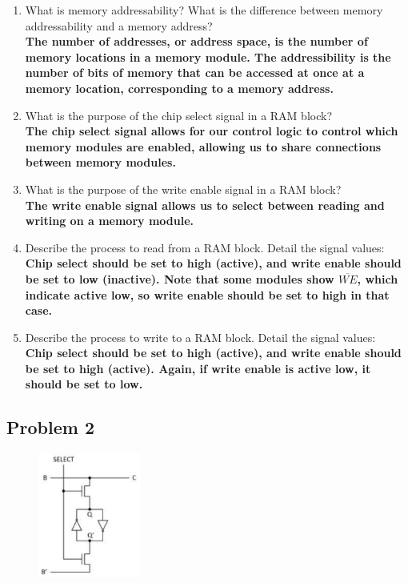 \documentclass{article}
\begin{document}
\begin{enumerate}[label=\alph*.]
\item What is memory addressability? What is the difference between memory addressability and a memory address? \\
\textbf{The number of addresses, or address space, is the number of memory locations in a memory module. The addressibility is the number of bits of memory that can be accessed at once at a memory location, corresponding to a memory address.}
\item What is the purpose of the chip select signal in a RAM block? \\
\textbf{The chip select signal allows for our control logic to control which memory modules are enabled, allowing us to share connections between memory modules.}
\item What is the purpose of the write enable signal in a RAM block? \\
\textbf{The write enable signal allows us to select between reading and writing on a memory module.}
\item Describe the process to read from a RAM block. Detail the signal values: \\
\textbf{Chip select should be set to high (active), and write enable should be set to low (inactive). Note that some modules show $\overline{WE}$, which indicate active low, so write enable should be set to high in that case.}
\item Describe the process to write to a RAM block. Detail the signal values: \\
\textbf{Chip select should be set to high (active), and write enable should be set to high (active). Again, if write enable is active low, it should be set to low. }

\end{enumerate}
\newpage
\subsection*{Problem 2}
\begin{figure}[!h]
    \centering
    \includegraphics[width=0.3\textwidth]{figures/memory_q2.png}
\end{figure}
\end{document}
